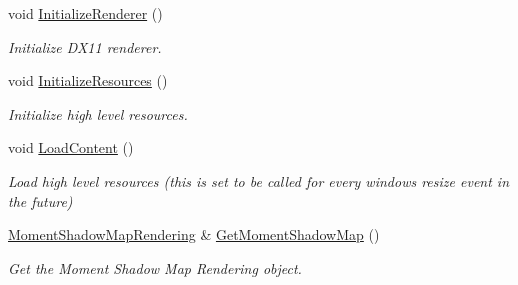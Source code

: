 \begin{DoxyCompactItemize}
void \hyperlink{classAppRenderer_abcb06ec3a4f44df9a6b93c9da882e150}{Initialize\+Renderer} ()
\begin{DoxyCompactList}\small\item\em Initialize D\+X11 renderer. \end{DoxyCompactList}\item 
\mbox{\label{classAppRenderer_a469d6a18301eabc3c4942a2a7d95a5fe}} 
void \hyperlink{classAppRenderer_a469d6a18301eabc3c4942a2a7d95a5fe}{Initialize\+Resources} ()
\begin{DoxyCompactList}\small\item\em Initialize high level resources. \end{DoxyCompactList}\item 
\mbox{\label{classAppRenderer_a243e0f5390b30ead7661cda98fd606a6}} 
void \hyperlink{classAppRenderer_a243e0f5390b30ead7661cda98fd606a6}{Load\+Content} ()
\begin{DoxyCompactList}\small\item\em Load high level resources (this is set to be called for every windows resize event in the future) \end{DoxyCompactList}\item 
\hyperlink{classMomentShadowMapRendering}{Moment\+Shadow\+Map\+Rendering} \& \hyperlink{classAppRenderer_af86218b9be6d10b9a5f39e89dc828d53}{Get\+Moment\+Shadow\+Map} ()
\begin{DoxyCompactList}\small\item\em Get the Moment Shadow Map Rendering object. \end{DoxyCompactList}\end{DoxyCompactItemize}
